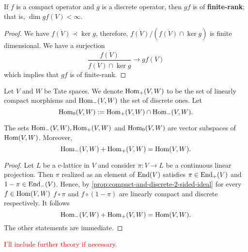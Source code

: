 \begin{remark}\label{rem:discrete-composition-compact}
If $f$ is a compact operator and $g$ is a discrete operator, then $gf$ is of \textbf{finite-rank}; that is, $\dim gf(V) < \infty$.  
\end{remark}
\begin{proof}
	We have $\overline{f(V)} \prec \ker g$, therefore, $\overline{f(V)}/(\overline{f(V)} \cap \ker g)$ is finite dimensional. We have a surjection
	\[
		\frac{\overline{f(V)}}{\overline{f(V)}\cap \ker g} \to gf(V)
	\]
	which implies that $gf$ is of finite-rank.
\end{proof}
\begin{definition}\label{def:2-sided-ideals-in-hom}
	Let $V$ and $W$ be Tate spaces. \linebreak We denote $\operatorname{Hom}_{+}(V,W)$ to be the set of linearly compact morphisms and $\operatorname{Hom}_{-}(V,W)$ the set of discrete ones. Let
	\[
		\operatorname{Hom}_{0}(V,W):=\operatorname{Hom}_{+}(V,W) \cap \operatorname{Hom}_{-}(V,W).
	\]
\end{definition}
\begin{proposition}\label{prop:discrete-compact-operators-present-the-whole-space}
	The sets $\operatorname{Hom}_{-}(V,W), \operatorname{Hom}_{+}(V,W)$ and \linebreak $\operatorname{Hom}_{0}(V,W)$ are vector subspaces of $\operatorname{Hom}(V,W)$. Moreover,
	\[
		\operatorname{Hom}_{-}(V,W) + \operatorname{Hom}_{+}(V,W) = \operatorname{Hom}(V,W).
	\]
\end{proposition}
\begin{proof}
	Let $L$ be a c-lattice in $V$ and consider $\pi\colon V \to L$ be a continuous linear projection. Then $\pi$ realized as an element of $\operatorname{End}(V)$ satisfies $\pi \in\operatorname{End}_{+}(V)$ and $1 -\pi\in\operatorname{End}_{-}(V)$. Hence, by \cref{prop:compact-and-discrete-2-sided-ideal} for every $f\in \operatorname{Hom}(V,W)$ $f\circ \pi$ and $f\circ (1 - \pi)$ are linearly compact and discrete respectively. It follows
	\[
		\operatorname{Hom}_{-}(V,W) + \operatorname{Hom}_{+}(V,W) = \operatorname{Hom}(V,W).
	\]
	The other statements are immediate.
\end{proof}
\textcolor{red}{I'll include further theory if necessary.}
